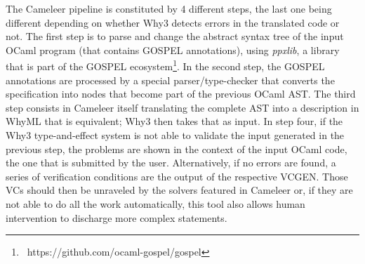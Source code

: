 The Cameleer pipeline is constituted by 4 different steps, the last one being different depending on whether Why3 detects errors in the translated code or not.
The first step is to parse and change the abstract syntax tree of the input OCaml program (that contains GOSPEL annotations), using \emph{ppxlib}, a library that is part of the GOSPEL ecosystem\protect\footnote{\ https://github.com/ocaml-gospel/gospel}.
In the second step, the GOSPEL annotations are processed by a special parser/type-checker that converts the specification into nodes that become part of the previous OCaml AST.
The third step consists in Cameleer itself translating the complete AST into a description in WhyML that is equivalent; Why3 then takes that as input.
In step four, if the Why3 type-and-effect system is not able to validate the input generated in the previous step, the problems are shown in the context of the input OCaml code, the one that is submitted by the user. 
Alternatively, if no errors are found, a series of verification conditions are the output of the respective VCGEN.
Those VCs should then be unraveled by the solvers featured in Cameleer or, if they are not able to do all the work automatically, this tool also allows human intervention to discharge more complex statements.


